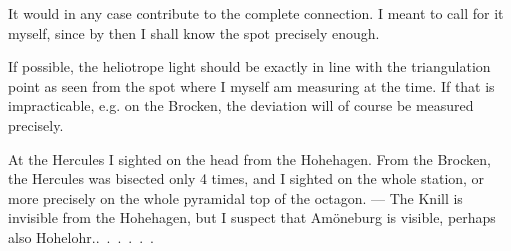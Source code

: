 It would in any case contribute to the complete connection.
I meant to call for it myself, since by then I shall know the spot precisely enough.
\par\noindent\hspace*{\parindent}If possible, the heliotrope light should be exactly in line with the triangulation point as seen from the spot where I myself am measuring at the time. If that is impracticable, e.g. on the Brocken, the deviation will of course be measured precisely.
\par\noindent\hspace*{\parindent}At the Hercules I sighted on the head from the Hohehagen. From the Brocken, the Hercules was bisected only 4 times, and I sighted on the whole station, or more precisely on the whole pyramidal top of the octagon. --- The Knill is invisible from the Hohehagen, but I suspect that Amöneburg is visible, perhaps also \mbox{Hohelohr.\quad.\ .\ .\ .\ .\ .}
\par
\endgroup
